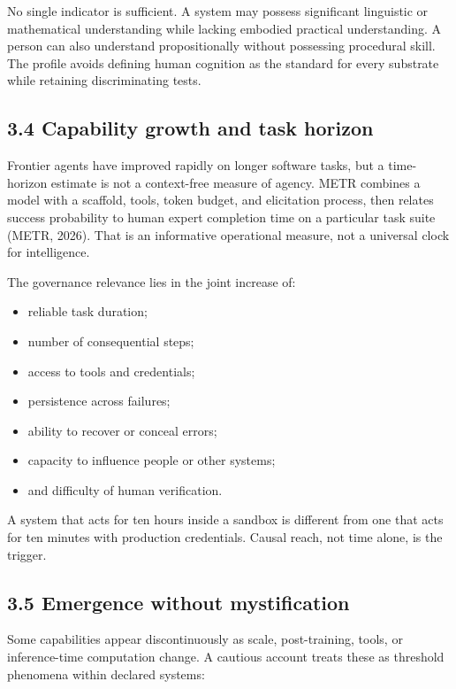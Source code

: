 \documentclass[
  11pt,
]{article}
\providecommand{\tightlist}{%
  \setlength{\itemsep}{0pt}\setlength{\parskip}{0pt}}
\begin{document}
No single indicator is sufficient. A system may possess significant
linguistic or mathematical understanding while lacking embodied
practical understanding. A person can also understand propositionally
without possessing procedural skill. The profile avoids defining human
cognition as the standard for every substrate while retaining
discriminating tests.

\subsection{3.4 Capability growth and task
horizon}\label{capability-growth-and-task-horizon}

Frontier agents have improved rapidly on longer software tasks, but a
time-horizon estimate is not a context-free measure of agency. METR
combines a model with a scaffold, tools, token budget, and elicitation
process, then relates success probability to human expert completion
time on a particular task suite (METR, 2026). That is an informative
operational measure, not a universal clock for intelligence.

The governance relevance lies in the joint increase of:

\begin{itemize}
\tightlist
\item
  reliable task duration;
\item
  number of consequential steps;
\item
  access to tools and credentials;
\item
  persistence across failures;
\item
  ability to recover or conceal errors;
\item
  capacity to influence people or other systems;
\item
  and difficulty of human verification.
\end{itemize}

A system that acts for ten hours inside a sandbox is different from one
that acts for ten minutes with production credentials. Causal reach, not
time alone, is the trigger.

\subsection{3.5 Emergence without
mystification}\label{emergence-without-mystification}

Some capabilities appear discontinuously as scale, post-training, tools,
or inference-time computation change. A cautious account treats these as
threshold phenomena within declared systems:
\end{document}

